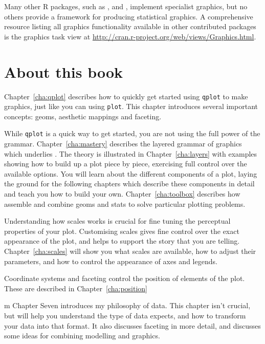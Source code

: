 Many other R packages, such as  \citep{meyer:2006},  \citep{plotrix} and  \citep{gplots}, implement specialist graphics, but no others provide a framework for producing statistical graphics.  A comprehensive resource listing all graphics functionality available in other contributed packages is the graphics task view at \url{http://cran.r-project.org/web/views/Graphics.html}.  

\section{About this book}

Chapter~\ref{cha:qplot} describes how to quickly get started using {\tt qplot} to make graphics, just like you can using {\tt plot}.  This chapter introduces several important \ggplot concepts: geoms, aesthetic mappings and faceting.
  
While {\tt qplot} is a quick way to get started, you are not using the full power of the grammar.  Chapter~\ref{cha:mastery} describes the layered grammar of graphics which underlies \ggplot.  The theory is illustrated in Chapter~\ref{cha:layers} with examples showing how to build up a plot piece by piece, exercising full control over the available options.  You will learn about the different components of a plot, laying the ground for the following chapters which describe these components in detail and teach you how to build your own.  Chapter~\ref{cha:toolbox} describes how assemble and combine geoms and stats \ggplot to solve particular plotting problems.

Understanding how scales works is crucial for fine tuning the perceptual properties of your plot.  Customising scales gives fine control over the exact appearance of the plot, and helps to support the story that you are telling.  Chapter~\ref{cha:scales} will show you what scales are available, how to adjust their parameters, and how to control the appearance of axes and legends.

Coordinate systems and faceting control the position of elements of the plot.  These are described in Chapter~\ref{cha:position}

m Chapter Seven introduces my philosophy of data.  This chapter isn't crucial, but will help you understand the type of data \ggplot expects, and how to transform your data into that format.  It also discusses faceting in more detail, and discusses some ideas for combining modelling and graphics.

